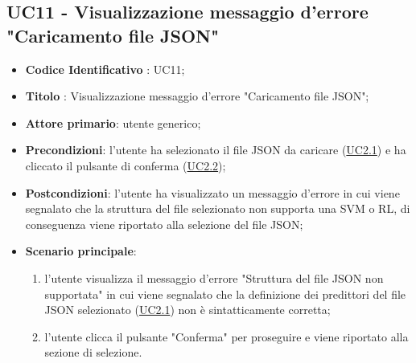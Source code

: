 	\subsection{UC11 - Visualizzazione messaggio d'errore "Caricamento file JSON" }
		\begin{itemize}
			\item\textbf{Codice Identificativo} : UC11;
			\item\textbf{Titolo} : Visualizzazione messaggio d'errore "Caricamento file JSON";
			\item\textbf{Attore primario}: utente generico;
			\item\textbf{Precondizioni}: l'utente ha selezionato il file JSON da caricare (\hyperref[par:UC2.1]{UC2.1}) e ha cliccato il pulsante di conferma (\hyperref[par:UC2.2]{UC2.2});
			\item\textbf{Postcondizioni}: l'utente ha visualizzato un messaggio d'errore in cui viene segnalato che la struttura del file selezionato non supporta una SVM o RL, di conseguenza viene riportato alla selezione del file JSON;
			\item\textbf{Scenario principale}:
				\begin{enumerate}
					\item l'utente visualizza il messaggio d'errore "Struttura del file JSON non supportata" in cui viene segnalato che la definizione dei predittori del file JSON selezionato (\hyperref[par:UC2.1]{UC2.1}) non è sintatticamente corretta;
					\item l'utente clicca il pulsante "Conferma" per proseguire e viene riportato alla sezione di selezione.
				\end{enumerate}
		\end{itemize}	


		\label{par:UC12}
